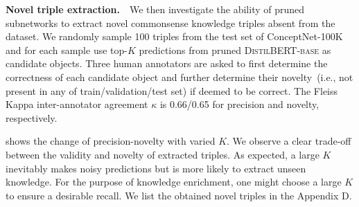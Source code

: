 \textbf{Novel triple extraction.}~~We then investigate the ability of pruned 
subnetworks to extract novel commonsense knowledge triples absent 
from the dataset. We randomly sample 100 triples from the test set of 
ConceptNet-100K and for each sample use top-$K$ predictions from 
pruned \textsc{DistilBERT-base} as candidate objects. 
Three human annotators are asked to first determine the correctness of 
each candidate object and further determine their novelty~(i.e., not present 
in any of train/validation/test set) if deemed to be correct. 
The Fleiss Kappa inter-annotator agreement $\kappa$ is 0.66/0.65 
for precision and novelty, respectively.


 shows the change of precision-novelty with varied $K$. We observe a clear trade-off between the validity and novelty of extracted triples. As expected, a large $K$ inevitably makes noisy predictions but is more likely to extract unseen knowledge. For the purpose of knowledge enrichment, one might choose a large $K$ to ensure a desirable recall. We list the obtained novel triples in the Appendix D.





